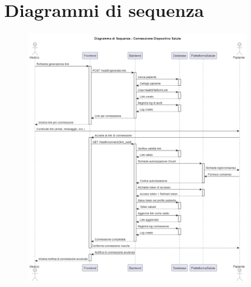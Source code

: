 \documentclass[12pt,a4paper,oneside]{report}
\begin{document}
\section{Diagrammi di sequenza}
\begin{figure}[H]
    \centering
    \includegraphics[width=0.85\textwidth]{images/uml/HealthDeviceConnection.png}
\end{figure}
\end{document}
